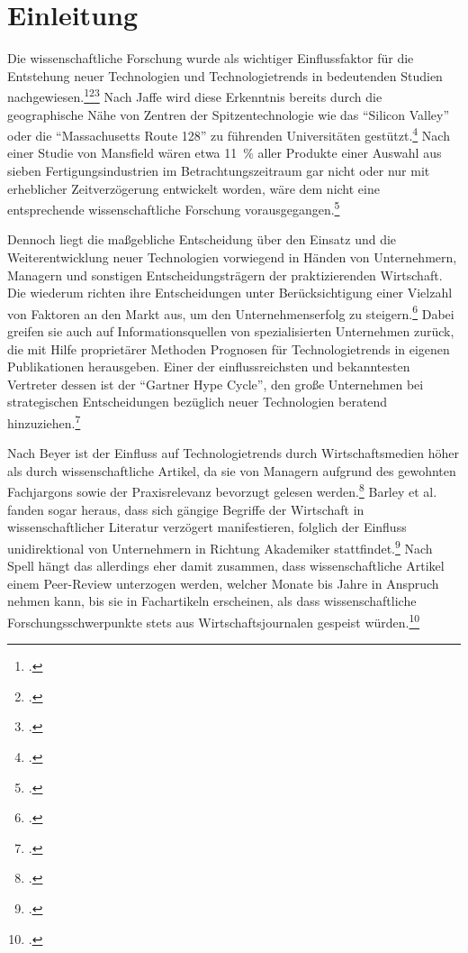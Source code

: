 \section{Einleitung}
Die wissenschaftliche Forschung wurde als wichtiger Einflussfaktor für die Entstehung neuer Technologien und Technologietrends in bedeutenden Studien nachgewiesen.\footcite[Vgl.][S.~187]{Nelson1986}\footcite[Vgl.][S.~11]{Mansfield1991}\footcite[Vgl.][S.~599]{Tegarden2012} Nach Jaffe wird diese Erkenntnis bereits durch die geographische Nähe von Zentren der Spitzentechnologie wie das "`Silicon Valley"' oder die "`Massachusetts Route 128"' zu führenden Universitäten gestützt.\footcite[Vgl.][S.~967f]{Jaffe1989} Nach einer Studie von Mansfield wären etwa 11~\% aller Produkte einer Auswahl aus sieben Fertigungsindustrien im Betrachtungszeitraum gar nicht oder nur mit erheblicher Zeitverzögerung entwickelt worden, wäre dem nicht eine entsprechende wissenschaftliche Forschung vorausgegangen.\footcite[Vgl.][S.~2]{Mansfield1991}

Dennoch liegt die maßgebliche Entscheidung über den Einsatz und die Weiterentwicklung neuer Technologien vorwiegend in Händen von Unternehmern, Managern und sonstigen Entscheidungsträgern der praktizierenden Wirtschaft. Die wiederum richten ihre Entscheidungen unter Berücksichtigung einer Vielzahl von Faktoren an den Markt aus, um den Unternehmenserfolg zu steigern.\footcite[Vgl.][S.~1652f]{Gruber2008} Dabei greifen sie auch auf Informationsquellen von spezialisierten Unternehmen zurück, die mit Hilfe proprietärer Methoden Prognosen für Technologietrends in eigenen Publikationen herausgeben. Einer der einflussreichsten und bekanntesten Vertreter dessen ist der "`Gartner Hype Cycle"', den große Unternehmen bei strategischen Entscheidungen bezüglich neuer Technologien beratend hinzuziehen.\footcite[Vgl.][S.~254]{Steinert2010}

Nach Beyer ist der Einfluss auf Technologietrends durch Wirtschaftsmedien höher als durch wissenschaftliche Artikel, da sie von Managern aufgrund des gewohnten Fachjargons sowie der Praxisrelevanz bevorzugt gelesen werden.\footcite[Vgl.][S.~472]{Beyer1992} Barley et al. fanden sogar heraus, dass sich gängige Begriffe der Wirtschaft in wissenschaftlicher Literatur verzögert manifestieren, folglich der Einfluss unidirektional von Unternehmern in Richtung Akademiker stattfindet.\footcite[Vgl.][S.~52]{Barley1988} Nach Spell hängt das allerdings eher damit zusammen, dass wissenschaftliche Artikel einem Peer-Review unterzogen werden, welcher Monate bis Jahre in Anspruch nehmen kann, bis sie in Fachartikeln erscheinen, als dass wissenschaftliche Forschungsschwerpunkte stets aus Wirtschaftsjournalen gespeist würden.\footcite[Vgl.][S.~345]{Spell1999} 

